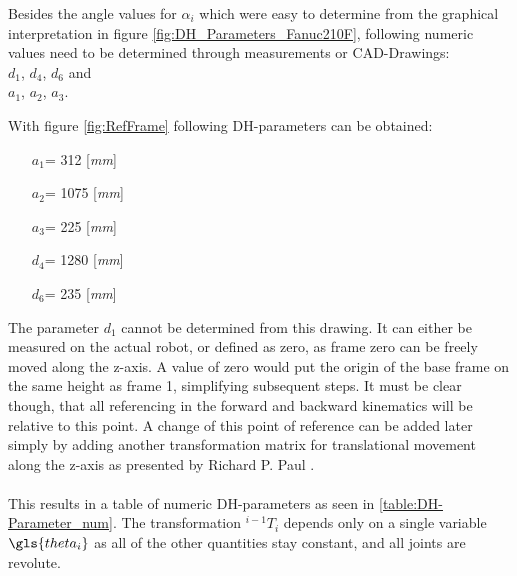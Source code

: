 Besides the angle values for $\alpha_i$ which were easy to determine from the graphical interpretation in figure \ref{fig:DH_Parameters_Fanuc210F}, following numeric values need to be determined through measurements or CAD-Drawings:\\
$d_1$, $d_4$, $d_6$ and \\
$a_1$, $a_2$, $a_3$. 

With figure \ref{fig:RefFrame} following \ac{DH}-parameters can be obtained:

\begin{itemize}\label{item:DH-LinparamValues}
	\item[$a_1$=] 312 [\textit{mm}]
	\item[$a_2$=] 1075 [\textit{mm}]
	\item[$a_3$=] 225 [\textit{mm}]
	\item[$d_4$=] 1280 [\textit{mm}]
	\item[$d_6$=] 235 [\textit{mm}]
\end{itemize}

The parameter $d_1$ cannot be determined from this drawing. It can either be measured on the actual robot, or defined as zero, as frame zero can be freely moved along the z-axis. A value of zero would put the origin of the base frame on the same height as frame 1, simplifying subsequent steps. 
It must be clear though, that all referencing in the forward and backward kinematics will be relative to this point. 
A change of this point of reference can be added later simply by adding another transformation matrix for translational movement along the z-axis as presented by Richard P. Paul \cite{Paul1981RobotM}.\\
\\
This results in a table of numeric DH-parameters as seen in \ref{table:DH-Parameter_num}. The transformation $^{i-1}T_i$ depends only on a single variable $\gls{theta_i}$ as all of the other quantities stay constant, and all joints are revolute.


